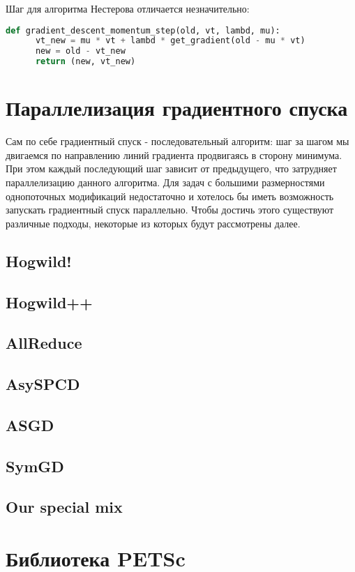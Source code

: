 \documentclass[12pt]{report}
\begin{document}
	Шаг для алгоритма Нестерова отличается незначительно:

  \begin{lstlisting}[language=Python, frame=single]
    def gradient_descent_momentum_step(old, vt, lambd, mu):
      vt_new = mu * vt + lambd * get_gradient(old - mu * vt)
      new = old - vt_new
      return (new, vt_new)
  \end{lstlisting}

  \chapter{Параллелизация градиентного спуска}
  Сам по себе градиентный спуск - последовательный алгоритм: шаг за шагом мы
  двигаемся по направлению линий градиента продвигаясь в сторону минимума.
  При этом каждый последующий шаг зависит от предыдущего, что затрудняет
  параллелизацию данного алгоритма. Для задач с большими размерностями
  однопоточных модификаций недостаточно и хотелось бы иметь возможность запускать
  градиентный спуск параллельно. Чтобы достичь этого существуют различные подходы,
  некоторые из которых будут рассмотрены далее.

  \section{Hogwild!}
  \section{Hogwild++}
  \section{AllReduce}
  \section{AsySPCD}
  \section{ASGD}
  \section{SymGD}
  \section{Our special mix}

  \chapter{Библиотека PETSc}
\end{document}
